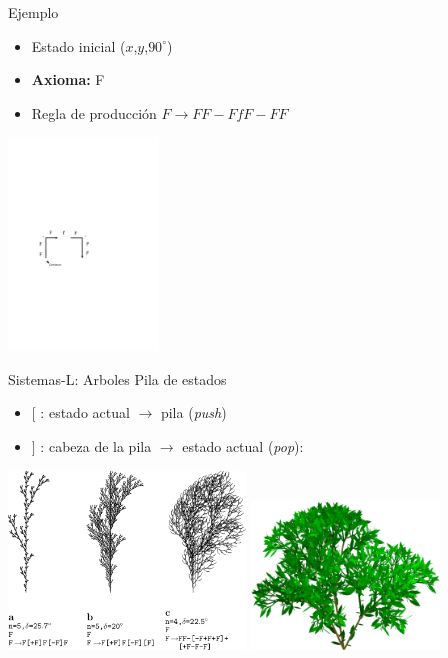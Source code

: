 \documentclass[spanish,unknownkeysallowed]{beamer}
\begin{document}
\begin{frame}{Ejemplo}
\begin{itemize}
\item Estado inicial ($x$,$y$,$90^{\circ}$)
\item \textbf{Axioma:} F
\item Regla de producción $F \rightarrow FF-FfF-FF$
\end{itemize}


\center
\includegraphics[width=4cm]{../figures/tortuga}

\end{frame}

\begin{frame}{Sistemas-L: Arboles}
Pila de estados
\begin{itemize}
\item $[$ : estado actual $\rightarrow$ pila ({\em push})
\item $]$ : cabeza de la pila $\rightarrow$ estado actual ({\em pop}):
\end{itemize}

\center
\includegraphics[width=6.3cm]{../figures/sistemalcorchete}
\includegraphics[width=5cm]{../figures/3dlsystem}

\end{frame}
\end{document}
